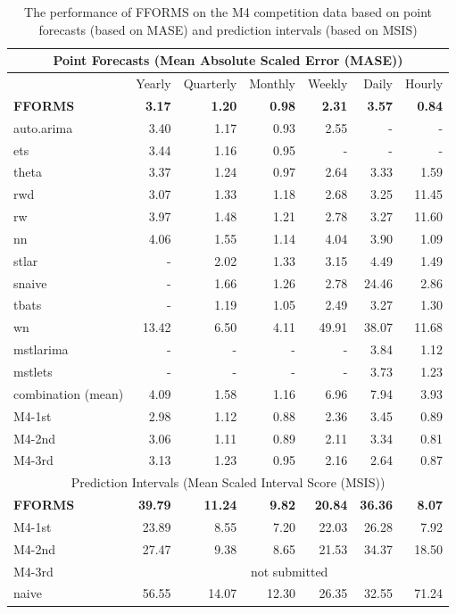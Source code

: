 \documentclass[11pt,a4paper,]{article}
\begin{document}
\begin{table}[!h]
\centering\scriptsize\tabcolsep=0.12cm
\caption{The performance of FFORMS on the M4 competition data based on point forecasts (based on MASE) and prediction intervals (based on MSIS)}
\label{forecasts}
\begin{tabular}{l|rrrrrr}
\hline
\multicolumn{7}{c}{Point Forecasts (Mean Absolute Scaled Error (MASE))} \\\hline
 & Yearly & Quarterly & Monthly & Weekly & Daily & Hourly \\\hline
\bf{FFORMS} & \bf{3.17} &  \bf{1.20} &  \bf{0.98}&  \bf{2.31}& \bf{3.57} &  \bf{0.84}\\
auto.arima & 3.40 &1.17  &0.93  & 2.55 &  -& - \\
ets & 3.44 &  1.16& 0.95 &  -&-  &  -\\
theta & 3.37 &1.24  & 0.97 &2.64  & 3.33 & 1.59 \\
rwd & 3.07 & 1.33 & 1.18  & 2.68  & 3.25 & 11.45 \\
rw & 3.97 & 1.48 & 1.21  &2.78  & 3.27 & 11.60 \\
nn & 4.06 & 1.55 &  1.14 &4.04 & 3.90 & 1.09 \\
stlar & - & 2.02 &  1.33& 3.15 & 4.49 & 1.49 \\
snaive & - &  1.66& 1.26 &  2.78& 24.46 & 2.86 \\
tbats & - & 1.19 &  1.05& 2.49 & 3.27 &  1.30\\
wn & 13.42 &  6.50&  4.11&  49.91& 38.07 & 11.68 \\
mstlarima & - & - &  - & - & 3.84 &  1.12\\
mstlets & - &  - &  - &  - & 3.73 &  1.23\\
combination (mean) & 4.09 & 1.58 &  1.16&6.96  & 7.94 & 3.93 \\\hline
M4-1st & 2.98 & 1.12 &  0.88& 2.36 & 3.45 & 0.89\\
M4-2nd & 3.06 & 1.11 &  0.89& 2.11 & 3.34 & 0.81\\
M4-3rd & 3.13 & 1.23 &  0.95& 2.16 & 2.64 & 0.87\\\hline
\multicolumn{7}{c}{Prediction Intervals (Mean Scaled Interval Score (MSIS))} \\\hline
\bf{FFORMS} & \bf{39.79} &  \bf{11.24} &  \bf{9.82}&  \bf{20.84}& \bf{36.36} & \bf{8.07} \\
M4-1st & 23.89 & 8.55 &  7.20 & 22.03 & 26.28 & 7.92\\
M4-2nd & 27.47 & 9.38 &  8.65& 21.53 & 34.37 & 18.50\\
M4-3rd & \multicolumn{6}{c}{not submitted}\\
naive & 56.55 & 14.07 &  12.30 & 26.35 & 32.55 & 71.24\\\hline
\end{tabular}
\end{table}
\end{document}

